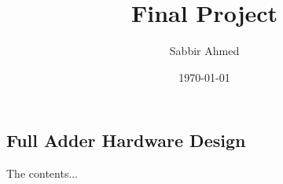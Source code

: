 \documentclass[titlepage]{article}
\title{Final Project}
\author{Sabbir Ahmed}
\date{\today}
\begin{document}
\maketitle
{\hypersetup{hidelinks}
    \tableofcontents
}

\newpage



\begin{appendices}
    \section{Full Adder Hardware Design}
    The contents...
\end{appendices}



\end{document}
